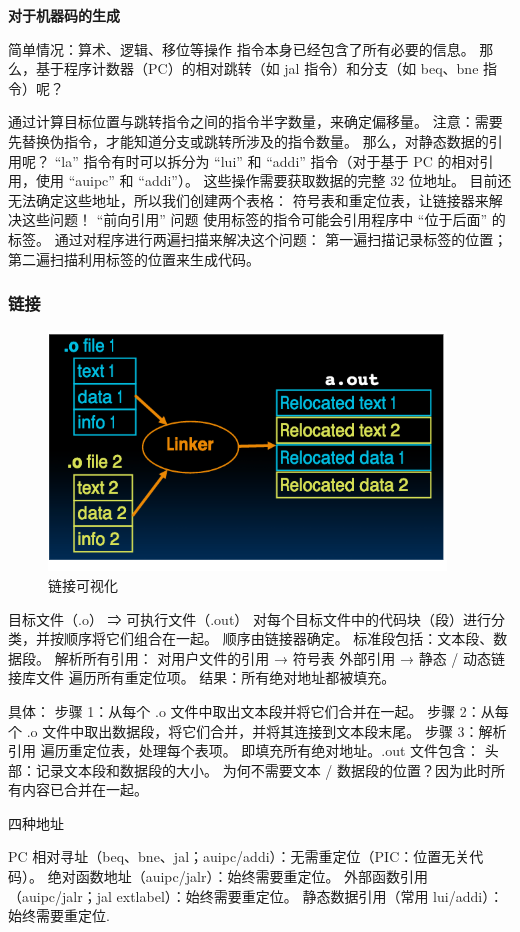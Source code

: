 \documentclass{ctexart}
\begin{document}
\textbf{对于机器码的生成}\par
简单情况：算术、逻辑、移位等操作
指令本身已经包含了所有必要的信息。
那么，基于程序计数器（PC）的相对跳转（如 jal 指令）和分支（如 beq、bne 指令）呢？\par
通过计算目标位置与跳转指令之间的指令半字数量，来确定偏移量。
注意：需要先替换伪指令，才能知道分支或跳转所涉及的指令数量。
那么，对静态数据的引用呢？
“la” 指令有时可以拆分为 “lui” 和 “addi” 指令（对于基于 PC 的相对引用，使用 “auipc” 和 “addi”）。
这些操作需要获取数据的完整 32 位地址。
目前还无法确定这些地址，所以我们创建两个表格：
符号表和重定位表，让链接器来解决这些问题！
“前向引用” 问题
使用标签的指令可能会引用程序中 “位于后面” 的标签。
通过对程序进行两遍扫描来解决这个问题：
第一遍扫描记录标签的位置；
第二遍扫描利用标签的位置来生成代码。\par
\subsubsection{链接}
\begin{figure}
    \centering
    \includegraphics[width=0.5\linewidth]{链接可视化.png}
    \caption{链接可视化}
    \label{fig:enter-label}
\end{figure}
目标文件（.o） ⇒ 可执行文件（.out）
对每个目标文件中的代码块（段）进行分类，并按顺序将它们组合在一起。
顺序由链接器确定。
标准段包括：文本段、数据段。
解析所有引用：
对用户文件的引用 → 符号表
外部引用 → 静态 / 动态链接库文件
遍历所有重定位项。
结果：所有绝对地址都被填充。\par
具体：
步骤 1：从每个 .o 文件中取出文本段并将它们合并在一起。
步骤 2：从每个 .o 文件中取出数据段，将它们合并，并将其连接到文本段末尾。
步骤 3：解析引用
遍历重定位表，处理每个表项。
即填充所有绝对地址。.out 文件包含：
头部：记录文本段和数据段的大小。
为何不需要文本 / 数据段的位置？因为此时所有内容已合并在一起。\par
四种地址\par
PC 相对寻址（beq、bne、jal；auipc/addi）：无需重定位（PIC：位置无关代码）。
绝对函数地址（auipc/jalr）：始终需要重定位。
外部函数引用（auipc/jalr；jal extlabel）：始终需要重定位。
静态数据引用（常用 lui/addi）：始终需要重定位.\par
\end{document}
